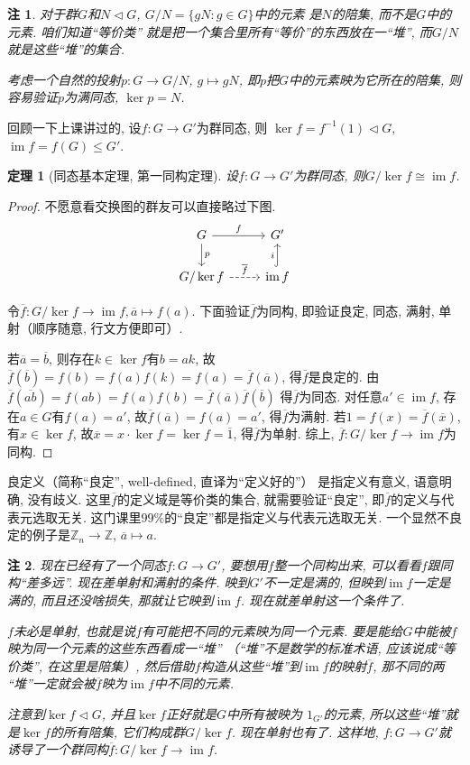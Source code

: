 \documentclass[12pt, a4paper, fontset=windows]{ctexart}
\newcommand{\Z}{\mathbb{Z}}
\newcommand{\cl}[1]{\overline{#1}} %
\newcommand{\im}{\operatorname{im}}
\newcommand{\isom}{\cong} %
\newcommand{\kh}[1]{（{#1}）} %
\newcommand{\yh}[1]{“{#1}”} %
\newtheorem*{remark}{注}
\newtheorem*{theorem}{定理}
\begin{document}
\begin{remark}
对于群$G$和$N\lhd G$, $G/N=\{gN:g\in G\}$中的元素
是$N$的陪集, 而不是$G$中的元素. 咱们知道\yh{等价类}
就是把一个集合里所有\yh{等价}的东西放在一\yh{堆}, 
而$G/N$就是这些\yh{堆}的集合. 

考虑一个自然的投射$p:G\to G/N$, $g\mapsto gN$, 
即$p$把$G$中的元素映为它所在的陪集, 
则容易验证$p$为满同态, $\ker p=N$. 
\end{remark}

回顾一下上课讲过的, 设$f:G\to G'$为群同态, 则
$\ker f=f^{-1}(1)\lhd G$, $\im f=f(G)\le G'$. 

\begin{theorem}[同态基本定理, 第一同构定理]
设$f:G\to G'$为群同态, 则$G/\ker f\isom\im f$. 
\end{theorem}

\begin{proof}
不愿意看交换图的群友可以直接略过下图. 
\[\begin{tikzcd}
G\rar["f"]\dar["p"]&G'\\
G/\ker f\rar["\cl{f}",dashrightarrow]&\im f\uar["i",hook]
\end{tikzcd}\] %

令$\cl{f}:G/\ker f\to\im f,\cl{a}\mapsto f(a)$. 
下面验证$\cl{f}$为同构, 即验证良定, 
同态, 满射, 单射\kh{顺序随意, 行文方便即可}. 

若$\cl{a}=\cl{b}$, 则存在$k\in\ker f$有$b=ak$, 
故$\cl{f}(\cl{b})=f(b)=f(a)f(k)=f(a)=\cl{f}(\cl{a})$, 
得$\cl{f}$是良定的. 由$\cl{f}(\cl{ab})=f(ab)=f(a)f(b)=\cl{f}(\cl{a})\cl{f}(\cl{b})$
得$\cl{f}$为同态. 对任意$a'\in\im f$, 存在$a\in G$有$f(a)=a'$, 
故$\cl{f}(\cl{a})=f(a)=a'$, 得$\cl{f}$为满射. 若$1=f(x)=\cl{f}(\cl{x})$, 
有$x\in\ker f$, 故$\cl{x}=x\cdot\ker f=\ker f=\cl{1}$, 
得$\cl{f}$为单射. 综上, $\cl{f}:G/\ker f\to\im f$为同构.
\end{proof}

良定义\kh{简称\yh{良定}, well-defined, 直译为\yh{定义好的}} 
是指定义有意义, 语意明确, 没有歧义. 这里$\cl{f}$的定义域是等价类的集合, 
就需要验证\yh{良定}, 即$\cl{f}$的定义与代表元选取无关. 
这门课里$99\%$的\yh{良定}都是指定义与代表元选取无关. 
一个显然不良定的例子是$\Z_n\to\Z$, $\cl{a}\mapsto a$. 

\begin{remark}
现在已经有了一个同态$f:G\to G'$, 要想用$f$整一个同构出来, 
可以看看$f$跟同构\yh{差多远}. 现在差单射和满射的条件. 
映到$G'$不一定是满的, 但映到$\im f$一定是满的, 而且还没啥损失, 
那就让它映到$\im f$. 现在就差单射这一个条件了. 

$f$未必是单射, 也就是说$f$有可能把不同的元素映为同一个元素. 
要是能给$G$中能被$f$映为同一个元素的这些东西看成一\yh{堆}
\kh{\yh{堆}不是数学的标准术语, 应该说成\yh{等价类}, 在这里是陪集}, 
然后借助$f$构造从这些\yh{堆}到$\im f$的映射$\cl{f}$, 那不同的两
\yh{堆}一定就会被$\cl{f}$映为$\im f$中不同的元素. 

注意到$\ker f\lhd G$, 并且$\ker f$正好就是$G$中所有被映为
$1_{G'}$的元素, 所以这些\yh{堆}就是$\ker f$的所有陪集, 
它们构成群$G/\ker f$. 现在单射也有了. 这样地, 
$f:G\to G'$就诱导了一个群同构$\cl{f}:G/\ker f\to\im f$. 
\end{remark}
\end{document}
